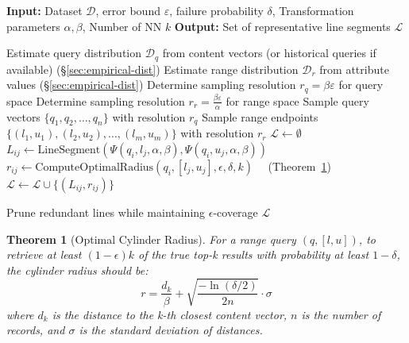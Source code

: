\documentclass[numbers,sort]{article}
\newtheorem{theorem}{Theorem}
\begin{document}
\begin{algorithm}[ht]
\caption{Adaptive Range Line Sampling}
\label{alg:adaptive-range}
\begin{algorithmic}[1]
\STATE \textbf{Input:} Dataset $\mathcal{D}$, error bound $\varepsilon$, failure probability $\delta$, Transformation parameters $\alpha,\beta$, Number of NN $k$ 
\STATE \textbf{Output:} Set of representative line segments $\mathcal{L}$

\STATE Estimate query distribution $\mathcal{D}_q$ from content vectors (or historical queries if available) (\hyperref[sec:empirical-dist]{\S\ref*{sec:empirical-dist}})
\STATE Estimate range distribution $\mathcal{D}_r$ from attribute values (\hyperref[sec:empirical-dist]{\S\ref*{sec:empirical-dist}})
\STATE Determine sampling resolution $r_q = \beta\varepsilon$ for query space
\STATE Determine sampling resolution $r_r = \frac{\beta\varepsilon}{\alpha}$ for range space
\STATE Sample query vectors $\{q_1, q_2, \ldots, q_n\}$ with resolution $r_q$
\STATE Sample range endpoints $\{(l_1, u_1), (l_2, u_2), \ldots, (l_m, u_m)\}$ with resolution $r_r$
\STATE $\mathcal{L} \leftarrow \emptyset$
        \STATE $L_{ij} \leftarrow \text{LineSegment}(\Psi(q_i, l_j, \alpha, \beta), \Psi(q_i, u_j, \alpha, \beta))$
        \STATE $r_{ij} \leftarrow \text{ComputeOptimalRadius}(q_i, [l_j, u_j],\epsilon,\delta,k)$ ~~(Theorem~\ref{thm:optimal-radius})
        \STATE $\mathcal{L} \leftarrow \mathcal{L} \cup \{(L_{ij}, r_{ij})\}$
    \ENDFOR
\ENDFOR

\STATE Prune redundant lines while maintaining $\epsilon$-coverage
\RETURN $\mathcal{L}$
\end{algorithmic}
\end{algorithm}

\begin{theorem}[Optimal Cylinder Radius]
\label{thm:optimal-radius}
For a range query $(q, [l, u])$, to retrieve at least $(1-\epsilon)k$ of the true top-k results with probability at least $1-\delta$, the cylinder radius should be:
\begin{equation}
r = \frac{d_k}{\beta} + \sqrt{\frac{-\ln(\delta/2)}{2n}} \cdot \sigma
\end{equation}
where $d_k$ is the distance to the k-th closest content vector, $n$ is the number of records, and $\sigma$ is the standard deviation of distances.
\end{theorem}
\end{document}
